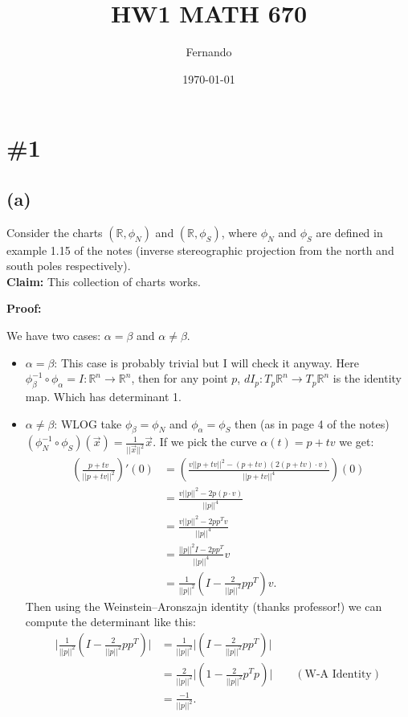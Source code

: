 \documentclass{article}
\begin{document}
\newcommand{\R}{\mathbb{R}}

\title{HW1 MATH 670}
\author{Fernando}
\date{\today}
\maketitle

\section*{\#1}
\subsection*{(a)}
Consider the charts $(\R,\phi_N)$ and
$(\R,\phi_S)$, where $\phi_N$ and $\phi_S$ are
defined in example 1.15 of the notes (inverse
stereographic projection from the north and south poles
respectively).\\
\textbf{Claim:} This collection of charts
works.

\textbf{Proof:}

We have two cases: $\alpha=\beta$ and $\alpha\neq\beta$.
\begin{itemize}
	\item $\alpha=\beta$: This case is probably
		trivial but I will check it anyway.
		Here
		$\phi_\beta^{-1}\circ\phi_\alpha=I:\R^n\to\R^n$,
		then for any point $p$,
		$dI_p:T_p\R^n\to T_p\R^n$ is the
		identity map. Which has determinant
		1.

	\item $\alpha\neq\beta$: WLOG take $\phi_\beta=\phi_N$ and
		$\phi_\alpha=\phi_S$ then (as in page 4 of the notes)
		$(\phi_N^{-1}\circ\phi_S)(\vec{x})=\frac{1}{||\vec{x}||^2}\vec{x}$.
		If we pick the curve $\alpha(t)=p+tv$ we get:
		\begin{align*}
			\left(\frac{p+tv}{||p+tv||^2}\right)'(0)
			&=\left(\frac{v||p+tv||^2-(p+tv)\left(2(p+tv)\cdot v\right)}{||p+tv||^4}\right)(0)\\
			&=\frac{v||p||^2-2p(p\cdot v)}{||p||^4}\\
			&=\frac{v||p||^2-2pp^Tv}{||p||^4}\\
			&=\frac{||p||^2I-2pp^T}{||p||^4}v\\
			&=\frac{1}{||p||^2}\left(I-\frac{2}{||p||^2}pp^T\right)v.
		\end{align*}
		Then using the Weinstein–Aronszajn identity (thanks professor!) we can compute the determinant like this:
		\begin{align*}
\bigg|\frac{1}{||p||^2}\left(I-\frac{2}{||p||^2}pp^T\right)\bigg|
&= \frac{1}{||p||^2}\bigg|\left(I-\frac{2}{||p||^2}pp^T\right)\bigg|\\
&=\frac{2}{||p||^2}\bigg|\left(1-\frac{2}{||p||^2}p^Tp\right)\bigg|\qquad(\text{W-A Identity})\\
&=\frac{-1}{||p||^2}.
		\end{align*}
\end{itemize}
\end{document}
